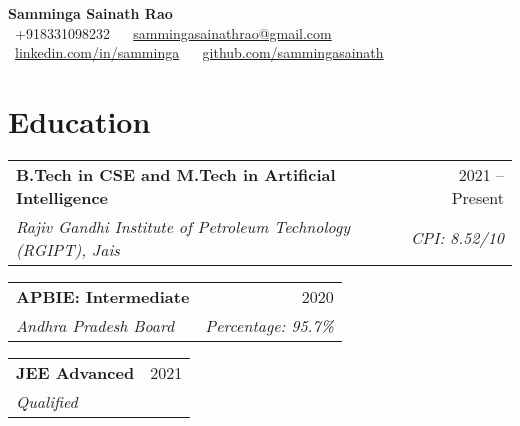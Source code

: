 \documentclass[a4paper]{article}
\makeatletter
\newcommand{\resumeSubheading}[4]{
  \vspace{-1pt}\item
    \begin{tabular*}{\textwidth}{l@{\extracolsep{\fill}}r}
      \textbf{#1} & #2 \\
      \textit{\small#3} & \textit{\small #4} \\
    \end{tabular*}\vspace{-5pt}
}
\makeatother
\begin{document}
\begin{center}
    \textbf{\Huge Samminga Sainath Rao} \\
    \small \faPhone\ +918331098232 ~ \faEnvelope\ \href{mailto:sammingasainathrao@gmail.com}{sammingasainathrao@gmail.com} ~ 
    \faLinkedin\ \href{https://www.linkedin.com/in/samminga}{linkedin.com/in/samminga} ~ 
    \faGithub\ \href{https://github.com/sammingasainath}{github.com/sammingasainath}
\end{center}

\section{Education}
\begin{resumeSubHeadingList}
    \resumeSubheading
    {B.Tech in CSE and M.Tech in Artificial Intelligence}{2021 -- Present}
    {Rajiv Gandhi Institute of Petroleum Technology (RGIPT), Jais}{CPI: 8.52/10}
    \resumeSubheading
    {APBIE: Intermediate}{2020}
    {Andhra Pradesh Board}{Percentage: 95.7\%}
    \resumeSubheading
    {JEE Advanced}{2021}
    {Qualified}{}
\end{resumeSubHeadingList}

\end{document}

